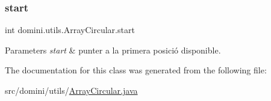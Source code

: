 \subsubsection{\texorpdfstring{start}{start}}
{\footnotesize\ttfamily int domini.\+utils.\+Array\+Circular.\+start\hspace{0.3cm}{\ttfamily [private]}}


\begin{DoxyParams}{Parameters}
{\em start} & punter a la primera posició disponible. \\
\hline
\end{DoxyParams}


The documentation for this class was generated from the following file\+:\begin{DoxyCompactItemize}
\item 
src/domini/utils/\hyperlink{ArrayCircular_8java}{Array\+Circular.\+java}\end{DoxyCompactItemize}
